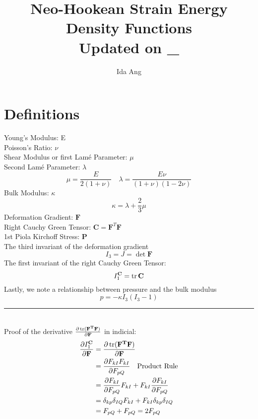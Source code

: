 \documentclass[12pt,3p]{article}
\numberwithin{equation}{section}
\begin{document}
\title{Neo-Hookean Strain Energy Density Functions \\
	\large{Updated on \_}}
\author{Ida Ang}
\date{\vspace{-5ex}}
\maketitle

\tableofcontents
\newpage

\section{Definitions}
Young's Modulus: E \\
Poisson's Ratio: $\nu$ \\
Shear Modulus or first Lamé Parameter: $\mu$ \\
Second Lamé Parameter: $\lambda$ 
\begin{equation}\label{EqLame}
\mu = \frac{E}{2 (1 + \nu)} \quad \lambda = \frac{E \nu}{(1+ \nu) (1 - 2 \nu)} 
\end{equation}
Bulk Modulus: $\kappa$ \\ 
\begin{equation}\label{EqBulk}
\kappa = \lambda + \frac{2}{3} \mu 
\end{equation}
Deformation Gradient: $\mathbf{F}$ \\
Right Cauchy Green Tensor: $\mathbf{C} = \mathbf{F}^T \mathbf{F}$ \\
1st Piola Kirchoff Stress: $\mathbf{P}$ \\
The third invariant of the deformation gradient 
\begin{equation}
I_3 = J = \det \mathbf{F} 
\end{equation}
The first invariant of the right Cauchy Green Tensor:
\begin{equation}\label{EqInvariants}
I^\mathbf{C}_1 = \trace \mathbf{C}  
\end{equation}
Lastly, we note a relationship between pressure and the bulk modulus
\begin{equation}\label{EqPressure}
p = - \kappa I_3 (I_3 - 1)
\end{equation}
\noindent\rule{19cm}{0.5pt} \\ %
Proof of the derivative $\pdv{\trace(\mathbf{F^T} \mathbf{F})}{\mathbf{F}}$ in indicial: 
\begin{align*}
\frac{\partial I_1^{\mathbf{C}}}{\partial \mathbf{F}} &= \pdv{\trace(\mathbf{F^T} \mathbf{F})}{\mathbf{F}} \\
									&= \pdv{F_{kI} F_{kI}}{F_{pQ}} \quad \text{Product Rule} \\ 
									&= \pdv{F_{kI}}{F_{pQ}} F_{kI} + F_{kI} \pdv{F_{kI}}{F_{pQ}} \\
									&= \delta_{kp} \delta_{IQ} F_{kI} + F_{kI} \delta_{kp} \delta_{IQ} \\
									&= F_{pQ} + F_{pQ} = 2 F_{pQ} 
\end{align*}
\end{document}
